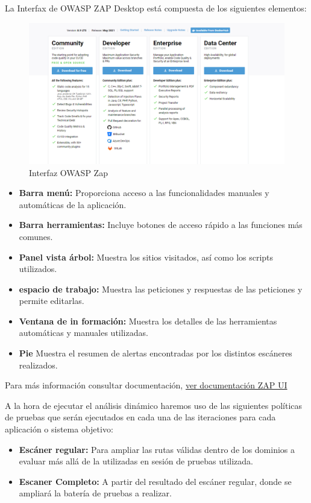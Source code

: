 La Interfax de OWASP ZAP Desktop está compuesta de los siguientes elementos:
\begin{figure}[h!]  
    \includegraphics[width=\linewidth]{./imagenes/02_SonarQubeEditions.png}
    \caption{Interfaz OWASP Zap}  
    \label{fig:11 - Interfaz OWASP Zap}
\end{figure}

\begin{itemize}
    \item \textbf{Barra menú:} Proporciona acceso a las funcionalidades manuales y automáticas de la aplicación.
    \item \textbf{Barra herramientas:} Incluye botones de acceso rápido a las funciones más comunes.
    \item \textbf{Panel vista árbol:} Muestra los sitios visitados, así como los scripts utilizados.
    \item \textbf{espacio de trabajo:} Muestra las peticiones y respuestas de las peticiones y permite editarlas.
    \item \textbf{Ventana de in formación:} Muestra los detalles de las herramientas automáticas y manuales utilizadas. 
    \item \textbf{Pie} Muestra el resumen de alertas encontradas por los distintos escáneres realizados.
\end{itemize}

Para más información consultar documentación, \href{https://www.zaproxy.org/docs/desktop/ui/}{ver documentación ZAP UI}

A la hora de ejecutar el análisis dinámico haremos uso de las siguientes políticas de pruebas 
que serán ejecutados en cada una de las iteraciones para cada aplicación o sistema objetivo:

\begin{itemize}
    \item \textbf{Escáner regular:} Para ampliar las rutas válidas dentro de los dominios a evaluar más allá de la utilizadas en sesión de pruebas utilizada.
    \item \textbf{Escaner Completo:} A partir del resultado del escáner regular, donde se ampliará la batería de pruebas a realizar.
\end{itemize}